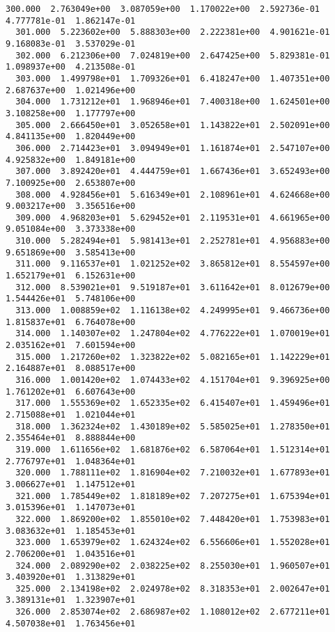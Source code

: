\begin{lstlisting}[style=tinysize]
  300.000  2.763049e+00  3.087059e+00  1.170022e+00  2.592736e-01  4.777781e-01  1.862147e-01 
  301.000  5.223602e+00  5.888303e+00  2.222381e+00  4.901621e-01  9.168083e-01  3.537029e-01 
  302.000  6.212306e+00  7.024819e+00  2.647425e+00  5.829381e-01  1.098937e+00  4.213508e-01 
  303.000  1.499798e+01  1.709326e+01  6.418247e+00  1.407351e+00  2.687637e+00  1.021496e+00 
  304.000  1.731212e+01  1.968946e+01  7.400318e+00  1.624501e+00  3.108258e+00  1.177797e+00 
  305.000  2.666450e+01  3.052658e+01  1.143822e+01  2.502091e+00  4.841135e+00  1.820449e+00 
  306.000  2.714423e+01  3.094949e+01  1.161874e+01  2.547107e+00  4.925832e+00  1.849181e+00 
  307.000  3.892420e+01  4.444759e+01  1.667436e+01  3.652493e+00  7.100925e+00  2.653807e+00 
  308.000  4.928456e+01  5.616349e+01  2.108961e+01  4.624668e+00  9.003217e+00  3.356516e+00 
  309.000  4.968203e+01  5.629452e+01  2.119531e+01  4.661965e+00  9.051084e+00  3.373338e+00 
  310.000  5.282494e+01  5.981413e+01  2.252781e+01  4.956883e+00  9.651869e+00  3.585413e+00 
  311.000  9.116537e+01  1.021252e+02  3.865812e+01  8.554597e+00  1.652179e+01  6.152631e+00 
  312.000  8.539021e+01  9.519187e+01  3.611642e+01  8.012679e+00  1.544426e+01  5.748106e+00 
  313.000  1.008859e+02  1.116138e+02  4.249995e+01  9.466736e+00  1.815837e+01  6.764078e+00 
  314.000  1.140307e+02  1.247804e+02  4.776222e+01  1.070019e+01  2.035162e+01  7.601594e+00 
  315.000  1.217260e+02  1.323822e+02  5.082165e+01  1.142229e+01  2.164887e+01  8.088517e+00 
  316.000  1.001420e+02  1.074433e+02  4.151704e+01  9.396925e+00  1.761202e+01  6.607643e+00 
  317.000  1.555369e+02  1.652335e+02  6.415407e+01  1.459496e+01  2.715088e+01  1.021044e+01 
  318.000  1.362324e+02  1.430189e+02  5.585025e+01  1.278350e+01  2.355464e+01  8.888844e+00 
  319.000  1.611656e+02  1.681876e+02  6.587064e+01  1.512314e+01  2.776797e+01  1.048364e+01 
  320.000  1.788111e+02  1.816904e+02  7.210032e+01  1.677893e+01  3.006627e+01  1.147512e+01 
  321.000  1.785449e+02  1.818189e+02  7.207275e+01  1.675394e+01  3.015396e+01  1.147073e+01 
  322.000  1.869200e+02  1.855010e+02  7.448420e+01  1.753983e+01  3.083632e+01  1.185453e+01 
  323.000  1.653979e+02  1.624324e+02  6.556606e+01  1.552028e+01  2.706200e+01  1.043516e+01 
  324.000  2.089290e+02  2.038225e+02  8.255030e+01  1.960507e+01  3.403920e+01  1.313829e+01 
  325.000  2.134198e+02  2.024978e+02  8.318353e+01  2.002647e+01  3.389131e+01  1.323907e+01 
  326.000  2.853074e+02  2.686987e+02  1.108012e+02  2.677211e+01  4.507038e+01  1.763456e+01 

\end{lstlisting}
